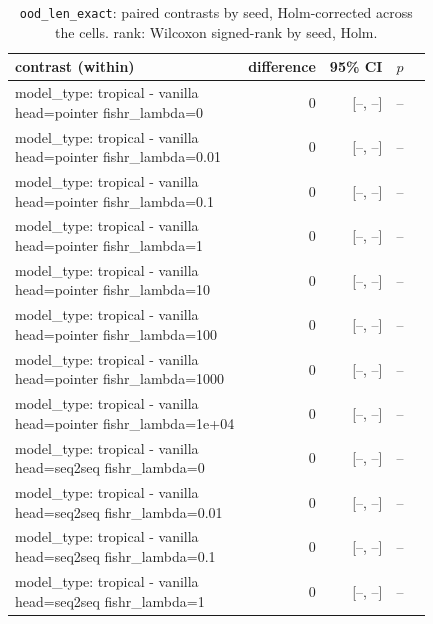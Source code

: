 \documentclass[10pt]{article}
\makeatletter
\newcommand{\stackcell}[1]{\begin{tabular}[t]{@{}l@{}}#1\end{tabular}}
\makeatother
\begin{document}
{\small
\begin{longtable}{lrrrl}
\caption{\texttt{ood\_len\_exact}: paired contrasts by seed, Holm-corrected across the cells. rank: Wilcoxon signed-rank by seed, Holm.}\label{tab:paired-ood_len_exact}\\
\toprule
contrast (within) & difference & 95\% CI & $p$ & \\
\midrule
\endhead
\stackcell{model\_type: tropical - vanilla\\\footnotesize head=pointer fishr\_lambda=0 } & 0 & [--, --] & -- & \\
\stackcell{model\_type: tropical - vanilla\\\footnotesize head=pointer fishr\_lambda=0.01 } & 0 & [--, --] & -- & \\
\stackcell{model\_type: tropical - vanilla\\\footnotesize head=pointer fishr\_lambda=0.1 } & 0 & [--, --] & -- & \\
\stackcell{model\_type: tropical - vanilla\\\footnotesize head=pointer fishr\_lambda=1 } & 0 & [--, --] & -- & \\
\stackcell{model\_type: tropical - vanilla\\\footnotesize head=pointer fishr\_lambda=10 } & 0 & [--, --] & -- & \\
\stackcell{model\_type: tropical - vanilla\\\footnotesize head=pointer fishr\_lambda=100 } & 0 & [--, --] & -- & \\
\stackcell{model\_type: tropical - vanilla\\\footnotesize head=pointer fishr\_lambda=1000 } & 0 & [--, --] & -- & \\
\stackcell{model\_type: tropical - vanilla\\\footnotesize head=pointer fishr\_lambda=1e+04 } & 0 & [--, --] & -- & \\
\stackcell{model\_type: tropical - vanilla\\\footnotesize head=seq2seq fishr\_lambda=0 } & 0 & [--, --] & -- & \\
\stackcell{model\_type: tropical - vanilla\\\footnotesize head=seq2seq fishr\_lambda=0.01 } & 0 & [--, --] & -- & \\
\stackcell{model\_type: tropical - vanilla\\\footnotesize head=seq2seq fishr\_lambda=0.1 } & 0 & [--, --] & -- & \\
\stackcell{model\_type: tropical - vanilla\\\footnotesize head=seq2seq fishr\_lambda=1 } & 0 & [--, --] & -- & \\

\end{longtable}}
\end{document}
